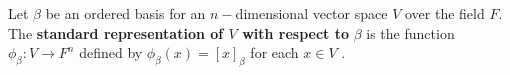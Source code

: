 \begin{definition}
    Let \( \beta \) be an ordered basis for an \( n- \)dimensional vector space \( V  \) over the field \( F \). The \textbf{standard representation of \( V \) with respect to} \( \beta  \) is the function \( {\phi}_{\beta}: V \to F^{n} \) defined by \( {\phi}_{\beta}(x) = [x]_{\beta} \) for each \( x \in V  \) .    
\end{definition}

